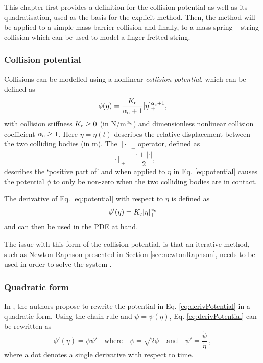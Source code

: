 This chapter first provides a definition for the collision potential as well as its quadratisation, used as the basis for the explicit method. Then, the method will be applied to a simple mass-barrier collision and finally, to a mass-spring -- string collision which can be used to model a finger-fretted string.

\subsubsection{Collision potential}
Collisions can be modelled using a nonlinear \textit{collision potential}, which can be defined as
\begin{equation}\label{eq:potential}
    \phi(\eta) = \frac{K_{\text{c}}}{\alpha_{\text{c}}+1}[\eta]_+^{\alpha_{\text{c}}+1},
\end{equation}
with collision stiffness $K_{\text{c}} \geq 0$ (in N/m$^{\alpha_{\text{c}}}$) and dimensionless nonlinear collision coefficient $\alpha_{\text{c}} \geq 1$. Here $\eta = \eta(t)$ describes the relative displacement between the two colliding bodies (in m). The $[\cdot ]_+$ operator, defined as 
\begin{equation}\label{eq:etaPlus}
    [\cdot]_+ = \frac{\cdot + |\cdot|}{2},
\end{equation}
describes the `positive part of' and when applied to $\eta$ in Eq. \eqref{eq:potential} causes the potential $\phi$ to only be non-zero when the two colliding bodies are in contact. 

The derivative of Eq. \eqref{eq:potential} with respect to $\eta$ is defined as 
\begin{equation}\label{eq:derivPotential}
    \phi'(\eta) = K_{\text{c}}[\eta]_+^{\alpha_{\text{c}}}
\end{equation}
and can then be used in the PDE at hand. 

The issue with this form of the collision potential, is that an iterative method, such as Newton-Raphson presented in Section \ref{sec:newtonRaphson}, needs to be used in order to solve the system \cite{Ducceschi2021}.

\subsubsection{Quadratic form}
In \cite{Ducceschi2021}, the authors propose to rewrite the potential in Eq. \eqref{eq:derivPotential} in a quadratic form. Using the chain rule and  $\psi = \psi(\eta)$, Eq. \eqref{eq:derivPotential} can be rewritten as
\begin{equation}\label{eq:quadraticPotential}
    \phi'(\eta) = \psi\psi' \quad \text{where} \quad \psi = \sqrt{2\phi} \quad \text{and} \quad \psi' = \frac{\dot{\psi}}{\dot{\eta}}\ ,
\end{equation}
where a dot denotes a single derivative with respect to time. 

